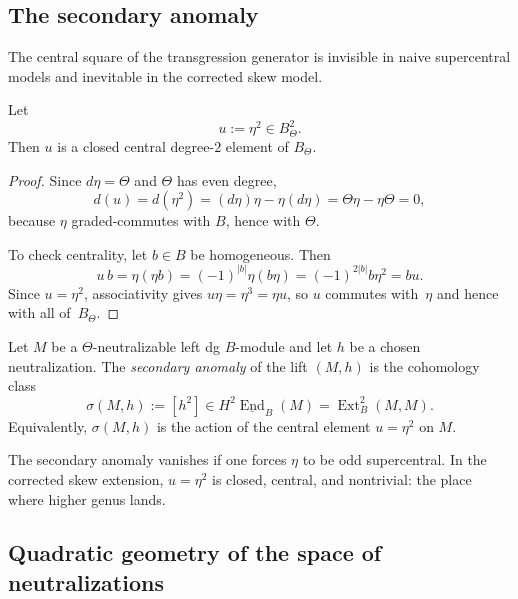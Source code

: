 \subsection{The secondary anomaly}
\label{subsec:tholog-secondary-anomaly}

The central square of the transgression generator is invisible in naive supercentral models and inevitable in the corrected skew model.

\begin{proposition}
\label{prop:tholog-secondary-central-class}
Let
\[
u:=\eta^{2}\in B_{\Theta}^{2}.
\]
Then \(u\) is a closed central degree-\(2\) element of \(B_{\Theta}\).
\end{proposition}

\begin{proof}
Since \(d\eta=\Theta\) and \(\Theta\) has even degree,
\[
d(u)=d(\eta^{2})=(d\eta)\eta-\eta(d\eta)=\Theta\eta-\eta\Theta=0,
\]
because \(\eta\) graded-commutes with \(B\), hence with \(\Theta\).

To check centrality, let \(b\in B\) be homogeneous.
Then
\[
u\,b=\eta(\eta b)=(-1)^{|b|}\eta(b\eta)=(-1)^{2|b|}b\eta^{2}=bu.
\]
Since \(u = \eta^2\), associativity gives \(u\eta = \eta^3 = \eta u\), so \(u\) commutes with~\(\eta\) and hence with all of~\(B_\Theta\).
\end{proof}

\begin{definition}
\label{def:tholog-secondary-anomaly}
Let \(M\) be a \(\Theta\)-neutralizable left dg \(B\)-module and let \(h\) be a chosen neutralization.
The \emph{secondary anomaly} of the lift \((M,h)\) is the cohomology class
\[
\sigma(M,h):=[h^{2}]
\in
H^{2}\underline{\operatorname{End}}_{B}(M)
=
\operatorname{Ext}^{2}_{B}(M,M).
\]
Equivalently, \(\sigma(M,h)\) is the action of the central element \(u=\eta^{2}\) on \(M\).
\end{definition}

\begin{remark}
\label{rem:tholog-secondary-why-new}
The secondary anomaly vanishes if one forces \(\eta\) to be odd supercentral.
In the corrected skew extension, \(u=\eta^{2}\) is closed, central, and nontrivial:
the place where higher genus lands.
\end{remark}

\subsection{Quadratic geometry of the space of neutralizations}
\label{subsec:tholog-quadratic-geometry}


